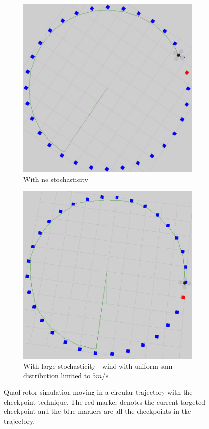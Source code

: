 \documentclass[hidelinks,BTech]{iitmdiss}
\begin{document}
\begin{figure}[H]
  \centering
  \begin{subfigure}[t]{0.45\textwidth}
    \centering
      \includegraphics[width=\textwidth]{checkpoint_circle.png}
      \caption{With no stochasticity}
  \end{subfigure}
  \begin{subfigure}[t]{0.45\textwidth}
    \centering
      \includegraphics[width=\textwidth]{checkpoint_circle_wind.png}
      \caption{With large stochasticity - wind with uniform sum distribution limited to $5 m/s$}
  \end{subfigure}
  \caption{Quad-rotor simulation moving in a circular trajectory with the checkpoint technique. The red marker denotes the current targeted checkpoint and the blue markers are all the checkpoints in the trajectory.}
\end{figure}
\end{document}
